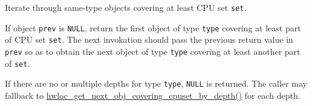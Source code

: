 Iterate through same-type objects covering at least CPU set {\tt set}. 

If object {\tt prev} is {\tt NULL}, return the first object of type {\tt type} covering at least part of CPU set {\tt set}. The next invokation should pass the previous return value in {\tt prev} so as to obtain the next object of type {\tt type} covering at least another part of {\tt set}.

If there are no or multiple depths for type {\tt type}, {\tt NULL} is returned. The caller may fallback to \hyperlink{group__hwlocality__helper__find__coverings_g39cbd3f1608d0fe503d396430cffe219}{hwloc\_\-get\_\-next\_\-obj\_\-covering\_\-cpuset\_\-by\_\-depth()} for each depth. 
